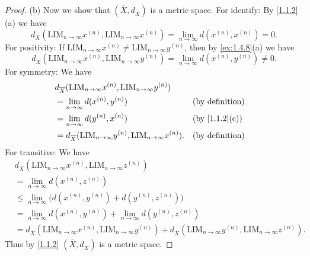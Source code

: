 \begin{proof}{(b)}
  Now we show that \((\overline{X}, d_{\overline{X}})\) is a metric space.
  For identify:
  By \cref{1.1.2}(a) we have
  \[
    d_{\overline{X}}(\text{LIM}_{n \to \infty} x^{(n)}, \text{LIM}_{n \to \infty} x^{(n)}) = \lim_{n \to \infty} d(x^{(n)}, x^{(n)}) = 0.
  \]
  For positivity:
  If \(\text{LIM}_{n \to \infty} x^{(n)} \neq \text{LIM}_{n \to \infty} y^{(n)}\), then by \cref{ex:1.4.8}(a) we have
  \[
    d_{\overline{X}}(\text{LIM}_{n \to \infty} x^{(n)}, \text{LIM}_{n \to \infty} y^{(n)}) = \lim_{n \to \infty} d(x^{(n)}, y^{(n)}) \neq 0.
  \]
  For symmetry:
  We have
  \begin{align*}
     & d_{\overline{X}}(\text{LIM}_{n \to \infty} x^{(n)}, \text{LIM}_{n \to \infty} y^{(n)})                                     \\
     & = \lim_{n \to \infty} d(x^{(n)}, y^{(n)})                                                 &  & \text{(by definition)}      \\
     & = \lim_{n \to \infty} d(y^{(n)}, x^{(n)})                                                 &  & \text{(by \cref{1.1.2}(c))} \\
     & = d_{\overline{X}}(\text{LIM}_{n \to \infty} y^{(n)}, \text{LIM}_{n \to \infty} x^{(n)}). &  & \text{(by definition)}
  \end{align*}
  For transitive:
  We have
  \begin{align*}
     & d_{\overline{X}}(\text{LIM}_{n \to \infty} x^{(n)}, \text{LIM}_{n \to \infty} z^{(n)})                                                                                             \\
     & = \lim_{n \to \infty} d(x^{(n)}, z^{(n)})                                                                                                                                          \\
     & \leq \lim_{n \to \infty} \big(d(x^{(n)}, y^{(n)}) + d(y^{(n)}, z^{(n)})\big)                                                                                                       \\
     & = \lim_{n \to \infty} d(x^{(n)}, y^{(n)}) + \lim_{n \to \infty} d(y^{(n)}, z^{(n)})                                                                                                \\
     & = d_{\overline{X}}(\text{LIM}_{n \to \infty} x^{(n)}, \text{LIM}_{n \to \infty} y^{(n)}) + d_{\overline{X}}(\text{LIM}_{n \to \infty} y^{(n)}, \text{LIM}_{n \to \infty} z^{(n)}).
  \end{align*}
  Thus by \cref{1.1.2} \((\overline{X}, d_{\overline{X}})\) is a metric space.
\end{proof}

